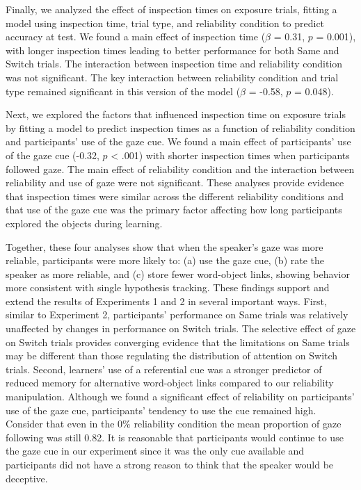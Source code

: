 \documentclass[oneside]{report}
\begin{document}
Finally, we analyzed the effect of inspection times on exposure trials,
fitting a model using inspection time, trial type, and reliability
condition to predict accuracy at test. We found a main effect of
inspection time (\(\beta\) = 0.31, \(p\) = 0.001), with longer
inspection times leading to better performance for both Same and Switch
trials. The interaction between inspection time and reliability
condition was not significant. The key interaction between reliability
condition and trial type remained significant in this version of the
model (\(\beta\) = -0.58, \(p\) = 0.048).

Next, we explored the factors that influenced inspection time on
exposure trials by fitting a model to predict inspection times as a
function of reliability condition and participants' use of the gaze cue.
We found a main effect of participants' use of the gaze cue (-0.32,
\(p\) \textless{} .001) with shorter inspection times when participants
followed gaze. The main effect of reliability condition and the
interaction between reliability and use of gaze were not significant.
These analyses provide evidence that inspection times were similar
across the different reliability conditions and that use of the gaze cue
was the primary factor affecting how long participants explored the
objects during learning.

Together, these four analyses show that when the speaker's gaze was more
reliable, participants were more likely to: (a) use the gaze cue, (b)
rate the speaker as more reliable, and (c) store fewer word-object
links, showing behavior more consistent with single hypothesis tracking.
These findings support and extend the results of Experiments 1 and 2 in
several important ways. First, similar to Experiment 2, participants'
performance on Same trials was relatively unaffected by changes in
performance on Switch trials. The selective effect of gaze on Switch
trials provides converging evidence that the limitations on Same trials
may be different than those regulating the distribution of attention on
Switch trials. Second, learners' use of a referential cue was a stronger
predictor of reduced memory for alternative word-object links compared
to our reliability manipulation. Although we found a significant effect
of reliability on participants' use of the gaze cue, participants'
tendency to use the cue remained high. Consider that even in the 0\%
reliability condition the mean proportion of gaze following was still
0.82. It is reasonable that participants would continue to use the gaze
cue in our experiment since it was the only cue available and
participants did not have a strong reason to think that the speaker
would be deceptive.
\end{document}
